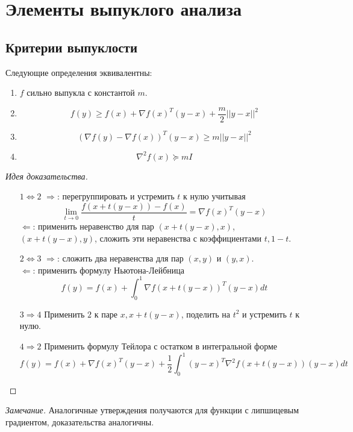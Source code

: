 \documentclass[10pt,a4paper]{article}
\newenvironment{sketch}
    {\begin{proof}[Идея доказательства]
    }
    { 
    \end{proof}
    }
\begin{document}
\section{Элементы выпуклого анализа}
\subsection{Критерии выпуклости}
Следующие определения эквивалентны:
\begin{enumerate}
\item $f$ сильно выпукла с константой $m$.
\item 
$$
f(y)\geq f(x)+\nabla f(x)^T(y-x)+\frac{m}{2}||y-x||^2
$$
\item 
$$
(\nabla f(y) - \nabla f(x))^T(y-x)\geq m||y-x||^2
$$
\item 
$$
\nabla^2f(x)\succeq mI
$$
\end{enumerate}
\begin{sketch}
\begin{itemize}
\item[$1\Leftrightarrow 2$] $\Rightarrow$: перегруппировать и устремить $t$ к нулю  учитывая
$$
\lim_{t\rightarrow 0}\frac{f(x+t(y-x))-f(x)}{t}=\nabla f(x)^T(y-x)
$$ 
$\Leftarrow$: применить неравенство для пар $(x+t(y-x), x)$, $(x+t(y-x), y)$, сложить эти неравенства с коэффициентами $t, 1-t$.
\item[$2\Leftrightarrow 3$] $\Rightarrow$: сложить два неравенства для пар $(x, y)$ и $(y, x)$.\\
$\Leftarrow$: применить формулу Ньютона-Лейбница
$$
f(y)=f(x)+\int_0^1\nabla f(x+t(y-x))^T(y-x)dt
$$ 
\item[$3\Rightarrow 4$] Применить $2$ к паре $x, x+t(y-x)$, поделить на $t^2$ и устремить $t$ к нулю.
\item[$4\Rightarrow 2$] Применить формулу Тейлора с остатком в интегральной форме
$$
f(y)=f(x)+\nabla f(x)^T(y-x) + \frac{1}{2}\int_0^1(y-x)^T\nabla^2f(x+t(y-x))(y-x)dt
$$
\end{itemize}
\end{sketch}

\textit{Замечание.} Аналогичные утверждения получаются для функции с липшицевым градиентом, доказательства аналогичны.
\end{document}
